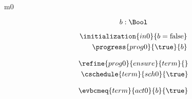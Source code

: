 \documentclass{article}
\begin{document}
	
\begin{machine}{m0}
	
\[
\variable{ b : \Bool }
\]
\begin{description}
\end{description}

\begin{align}
\initialization{in0}{b = \false} \\
\progress{prog0}{\true}{b}
\end{align}

\begin{align}
\refine{prog0}{ensure}{term}{} \\
\weakento{term}{default}{sch0} \\
\cschedule{term}{sch0}{\true} 
\end{align}

\begin{align}
\evbcmeq{term}{act0}{b}{\true}
\end{align}


\end{machine}

\newcommand{\Pcs}{\text{P}}
\end{document}
